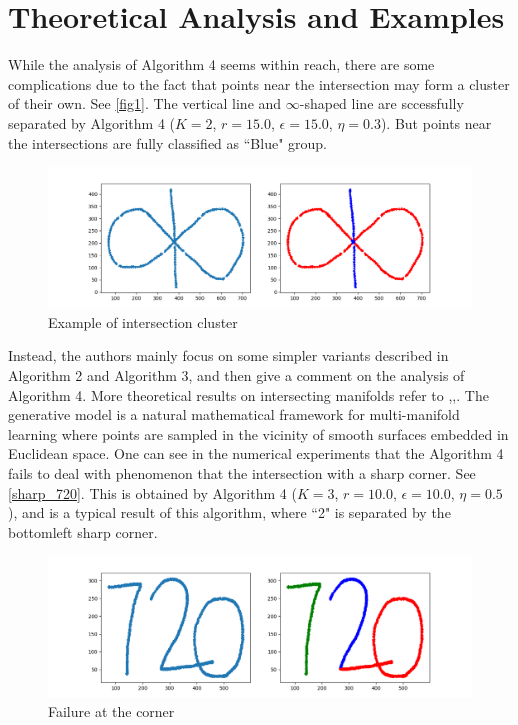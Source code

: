 \documentclass[twoside,11pt]{article}
\begin{document}
\section{Theoretical Analysis and Examples}
While the analysis of Algorithm 4 seems within reach, there are some complications due to the fact that points near the intersection may form a cluster of their own.
See \autoref{fig1}.
The vertical line and $\infty$-shaped line are sccessfully separated by Algorithm 4 ($K = 2$, $r = 15.0$, $\epsilon = 15.0$, $\eta = 0.3$).
But points near the intersections are fully classified as ``Blue" group. 
\begin{figure}[htbp]
\centering
\vspace{-1em}
\includegraphics[width=0.9 \textwidth]{infinity_shape.png}
\vspace{-1em}
\caption{Example of intersection cluster}
\label{fig1}
\end{figure}

Instead, the authors mainly focus on some simpler variants described in Algorithm 2 and Algorithm 3, and then give a comment on the analysis of Algorithm 4.
More theoretical results on intersecting manifolds 
refer to \cite{arias2011},\cite{chen2009},\cite{soltanolkotabi2012}.
The generative model is a natural mathematical framework for multi-manifold learning where points are sampled in the vicinity of smooth surfaces embedded in Euclidean space.
One can see in the numerical experiments that the Algorithm 4 fails to deal with phenomenon that the intersection with a sharp corner.
See \autoref{sharp_720}. This is obtained by  Algorithm 4  ($K = 3$, $r = 10.0$, $\epsilon = 10.0$, $\eta = 0.5$), and is a typical result of this algorithm, where ``2" is separated by the bottomleft sharp corner.
\begin{figure}[htbp]
\centering
\vspace{-1em}
\includegraphics[width=0.9  \textwidth]{sharp_720.png}
\vspace{-1em}
\caption{Failure at the corner}
\label{sharp_720}
\end{figure}
\end{document}

